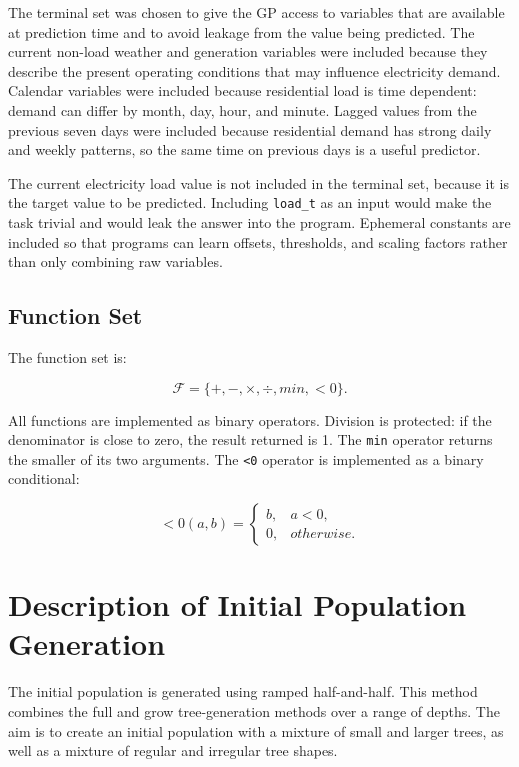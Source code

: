 \documentclass{article}
\begin{document}
The terminal set was chosen to give the GP access to variables that are available at prediction time and to avoid leakage from the value being predicted. The current non-load weather and generation variables were included because they describe the present operating conditions that may influence electricity demand. Calendar variables were included because residential load is time dependent: demand can differ by month, day, hour, and minute. Lagged values from the previous seven days were included because residential demand has strong daily and weekly patterns, so the same time on previous days is a useful predictor.

The current electricity load value is not included in the terminal set, because it is the target value to be predicted. Including \texttt{load\_t} as an input would make the task trivial and would leak the answer into the program. Ephemeral constants are included so that programs can learn offsets, thresholds, and scaling factors rather than only combining raw variables.

\subsection{Function Set}

The function set is:

\begin{equation}
\mathcal{F} = \{+, -, \times, \div, min, <0\}.
\end{equation}

All functions are implemented as binary operators. Division is protected: if the denominator is close to zero, the result returned is 1. The \texttt{min} operator returns the smaller of its two arguments. The \texttt{<0} operator is implemented as a binary conditional:

\begin{equation}
<0(a,b) =
\begin{cases}
b, & a < 0,\\
0, & otherwise.
\end{cases}
\end{equation}

\section{Description of Initial Population Generation}

The initial population is generated using ramped half-and-half. This method combines the full and grow tree-generation methods over a range of depths. The aim is to create an initial population with a mixture of small and larger trees, as well as a mixture of regular and irregular tree shapes.
\end{document}
